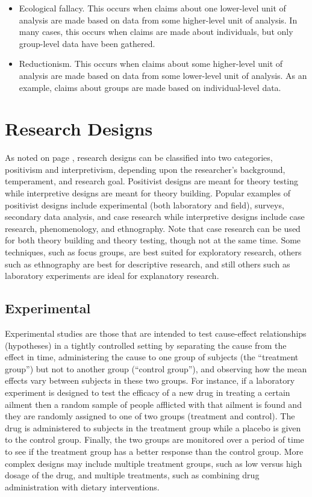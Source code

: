 \begin{itemize}
	\item Ecological fallacy. This occurs when claims about one lower-level unit of analysis are made based on data from some higher-level unit of analysis. In many cases, this occurs when claims are made about individuals, but only group-level data have been gathered. 

	\item Reductionism. This occurs when claims about some higher-level unit of analysis are made based on data from some lower-level unit of analysis. As an example, claims about groups are made based on individual-level data.

\end{itemize}

\section{Research Designs}

As noted on page \pageref{04:process}, research designs can be classified into two categories, \gls{positivism} and \gls{interpretivism}, depending upon the researcher's background, temperament, and research goal. Positivist designs are meant for theory testing while interpretive designs are meant for theory building. Popular examples of positivist designs include experimental (both laboratory and field), surveys, secondary data analysis, and case research while interpretive designs include case research, phenomenology, and ethnography. Note that case research can be used for both theory building and theory testing, though not at the same time. Some techniques, such as focus groups, are best suited for exploratory research, others such as ethnography are best for descriptive research, and still others such as laboratory experiments are ideal for explanatory research.

\subsection{Experimental}

Experimental studies are those that are intended to test cause-effect relationships (hypotheses) in a tightly controlled setting by separating the cause from the effect in time, administering the cause to one group of subjects (the ``treatment group'') but not to another group (``control group''), and observing how the mean effects vary between subjects in these two groups. For instance, if a laboratory experiment is designed to test the efficacy of a new drug in treating a certain ailment then a random sample of people afflicted with that ailment is found and they are randomly assigned to one of two groups (treatment and control). The drug is administered to subjects in the treatment group while a placebo is given to the control group. Finally, the two groups are monitored over a period of time to see if the treatment group has a better response than the control group. More complex designs may include multiple treatment groups, such as low versus high dosage of the drug, and multiple treatments, such as combining drug administration with dietary interventions. 

